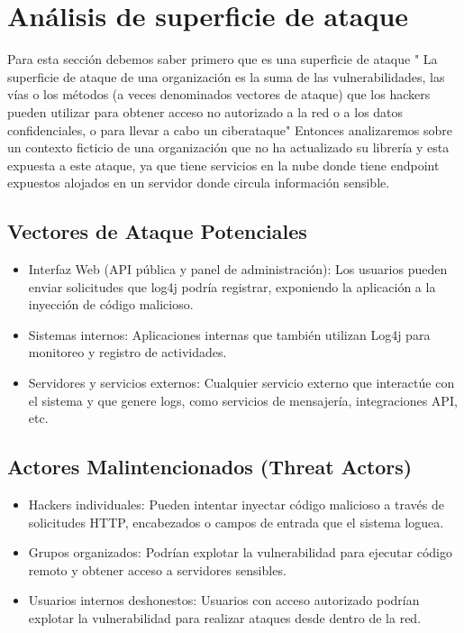 \documentclass[stu, 11pt, letterpaper, donotrepeattitle, floatsintext, natbib]{apa7}
\begin{document}
\newpage

\section{Análisis de superficie de ataque}
Para esta sección debemos saber primero que es una superficie de ataque " La superficie de ataque de una organización es la suma de las vulnerabilidades, las vías o los métodos (a veces denominados vectores de ataque) que los hackers pueden utilizar para obtener acceso no autorizado a la red o a los datos confidenciales, o para llevar a cabo un ciberataque"\citep{supataque}
Entonces analizaremos sobre un contexto ficticio de una organización que no ha actualizado su librería y esta expuesta a este ataque, ya que tiene servicios en la nube donde tiene endpoint expuestos alojados en un servidor donde circula información sensible.

\subsection{Vectores de Ataque Potenciales}

\begin{itemize}
    \item{Interfaz Web (API pública y panel de administración)}: Los usuarios pueden enviar solicitudes que log4j podría registrar, exponiendo la aplicación a la inyección de código malicioso.
    \item Sistemas internos: Aplicaciones internas que también utilizan Log4j para monitoreo y registro de actividades.
    
    \item Servidores y servicios externos: Cualquier servicio externo que interactúe con el sistema y que genere logs, como servicios de mensajería, integraciones API, etc.
\end{itemize}

\subsection{Actores Malintencionados (Threat Actors)}

\begin{itemize}
\item Hackers individuales: Pueden intentar inyectar código malicioso a través de solicitudes HTTP, encabezados o campos de entrada que el sistema loguea.
\item Grupos organizados: Podrían explotar la vulnerabilidad para ejecutar código remoto y obtener acceso a servidores sensibles.
\item Usuarios internos deshonestos: Usuarios con acceso autorizado podrían explotar la vulnerabilidad para realizar ataques desde dentro de la red.
\end{itemize}
\end{document}
